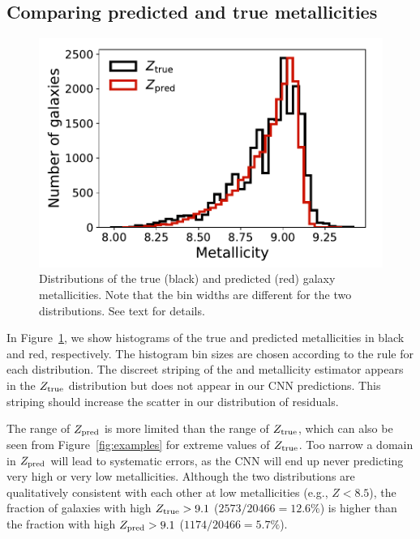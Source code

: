 \documentclass[fleqn,usenatbib]{mnras}
\newcommand{\eg}{e.g.}
\begin{document}
\subsection{Comparing predicted and true metallicities}
\begin{figure}
	\includegraphics[width=\columnwidth]{03-Z_distribution.pdf}
	\caption{\label{fig:distributions}
		Distributions of the true (black) and predicted (red) galaxy metallicities. Note that the bin widths are different for the two distributions. See text for details.}
\end{figure}

In Figure~\ref{fig:distributions}, we show histograms of the true and predicted metallicities in black and red, respectively. The histogram bin sizes are chosen according to the \cite{Freedman1981} rule for each distribution. The discreet striping of the \cite{Tremonti2004} and \cite{Brinchmann2004} metallicity estimator appears in the $Z_{\rm true}$ distribution but does not appear in our CNN predictions. This striping should increase the scatter in our distribution of residuals.

The range of $Z_{\rm pred}$ is more limited than the range of $Z_{\rm true}$, which can also be seen from Figure~\ref{fig:examples} for extreme values of $Z_{\rm true}$. Too narrow a domain in $Z_{\rm pred}$ will lead to systematic errors, as the CNN will end up never predicting very high or very low metallicities. Although the two distributions are qualitatively consistent with each other at low metallicities (\eg, $Z < 8.5$), the fraction of galaxies with high $Z_{\rm true} > 9.1$ ($2573/20466 = 12.6\%$) is higher than the fraction with high $Z_{\rm pred} > 9.1$ ($1174/20466 = 5.7\%$).
\end{document}
